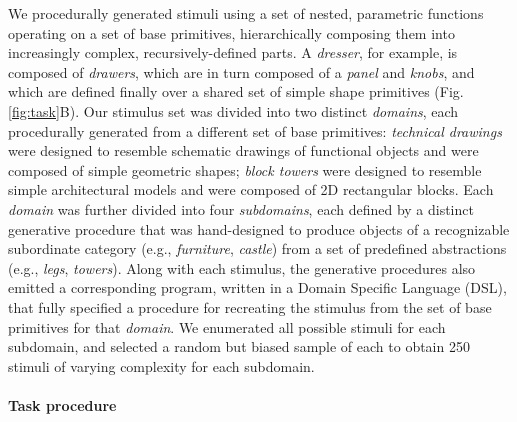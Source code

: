 \documentclass[10pt,letterpaper]{article}
\begin{document}

We procedurally generated stimuli using a set of nested, parametric functions operating on a set of base primitives, hierarchically composing them into increasingly complex, recursively-defined parts.
A \textit{dresser}, for example, is composed of \textit{drawers}, which are in turn composed of a \textit{panel} and \textit{knobs}, and which are defined finally over a shared set of simple shape primitives (Fig. \ref{fig:task}B).
Our stimulus set was divided into two distinct \textit{domains}, each procedurally generated from a different set of base primitives:
\textit{technical drawings} were designed to resemble schematic drawings of functional objects and were composed of simple geometric shapes; 
\textit{block towers} were designed to resemble simple architectural models and were composed of 2D rectangular blocks.
Each \textit{domain} was further divided into four \textit{subdomains}, each defined by a distinct generative procedure that was hand-designed to produce objects of a recognizable subordinate category (e.g., \textit{furniture}, \textit{castle}) from a set of predefined abstractions (e.g., \textit{legs}, \textit{towers}).
Along with each stimulus, the generative procedures also emitted a corresponding program, written in a Domain Specific Language (DSL), that fully specified a procedure for recreating the stimulus from the set of base primitives for that \textit{domain}.
We enumerated all possible stimuli for each subdomain, and selected a random but biased sample of each to obtain 250 stimuli of varying complexity for each subdomain.

\paragraph{Task procedure}
\end{document}
